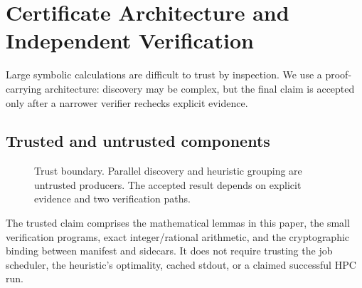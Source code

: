 \section{Certificate Architecture and Independent Verification}
\label{sec:verification}

Large symbolic calculations are difficult to trust by inspection.  We use a
proof-carrying architecture: discovery may be complex, but the final claim is
accepted only after a narrower verifier rechecks explicit evidence.

\subsection{Trusted and untrusted components}

\begin{figure}[t]
\centering
{}
\caption{Trust boundary.  Parallel discovery and heuristic grouping are
untrusted producers.  The accepted result depends on explicit evidence and
two verification paths.}
\label{fig:trust-boundary}
\end{figure}

The trusted claim comprises the mathematical lemmas in this paper, the small
verification programs, exact integer/rational arithmetic, and the cryptographic
binding between manifest and sidecars.  It does not require trusting the job
scheduler, the heuristic's optimality, cached stdout, or a claimed successful
HPC run.

